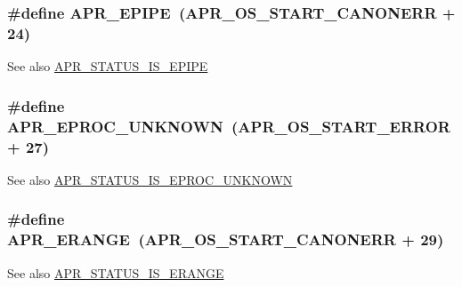 \subsubsection[{\texorpdfstring{A\+P\+R\+\_\+\+E\+P\+I\+PE}{APR_EPIPE}}]{\setlength{\rightskip}{0pt plus 5cm}\#define A\+P\+R\+\_\+\+E\+P\+I\+PE~({\bf A\+P\+R\+\_\+\+O\+S\+\_\+\+S\+T\+A\+R\+T\+\_\+\+C\+A\+N\+O\+N\+E\+RR} + 24)}\hypertarget{group__APR__Error_gae985330e30e374714ff1742485597f5d}{}\label{group__APR__Error_gae985330e30e374714ff1742485597f5d}
\begin{DoxySeeAlso}{See also}
\hyperlink{group__APR__STATUS__IS_gad1c0cf4e5619025a87c8edfc668d49f6}{A\+P\+R\+\_\+\+S\+T\+A\+T\+U\+S\+\_\+\+I\+S\+\_\+\+E\+P\+I\+PE} 
\end{DoxySeeAlso}
\subsubsection[{\texorpdfstring{A\+P\+R\+\_\+\+E\+P\+R\+O\+C\+\_\+\+U\+N\+K\+N\+O\+WN}{APR_EPROC_UNKNOWN}}]{\setlength{\rightskip}{0pt plus 5cm}\#define A\+P\+R\+\_\+\+E\+P\+R\+O\+C\+\_\+\+U\+N\+K\+N\+O\+WN~({\bf A\+P\+R\+\_\+\+O\+S\+\_\+\+S\+T\+A\+R\+T\+\_\+\+E\+R\+R\+OR} + 27)}\hypertarget{group__APR__Error_ga01b21dc62b410707f44641d3cea3e6ed}{}\label{group__APR__Error_ga01b21dc62b410707f44641d3cea3e6ed}
\begin{DoxySeeAlso}{See also}
\hyperlink{group__APR__STATUS__IS_gab1267636d1f3fe0dcb79a22b735a5010}{A\+P\+R\+\_\+\+S\+T\+A\+T\+U\+S\+\_\+\+I\+S\+\_\+\+E\+P\+R\+O\+C\+\_\+\+U\+N\+K\+N\+O\+WN} 
\end{DoxySeeAlso}
\subsubsection[{\texorpdfstring{A\+P\+R\+\_\+\+E\+R\+A\+N\+GE}{APR_ERANGE}}]{\setlength{\rightskip}{0pt plus 5cm}\#define A\+P\+R\+\_\+\+E\+R\+A\+N\+GE~({\bf A\+P\+R\+\_\+\+O\+S\+\_\+\+S\+T\+A\+R\+T\+\_\+\+C\+A\+N\+O\+N\+E\+RR} + 29)}\hypertarget{group__APR__Error_gaa8522357f7cc63343895901d107b0222}{}\label{group__APR__Error_gaa8522357f7cc63343895901d107b0222}
\begin{DoxySeeAlso}{See also}
\hyperlink{group__APR__STATUS__IS_ga0ffdf19bbd21e9c1aae55917dce00d91}{A\+P\+R\+\_\+\+S\+T\+A\+T\+U\+S\+\_\+\+I\+S\+\_\+\+E\+R\+A\+N\+GE} 
\end{DoxySeeAlso}
